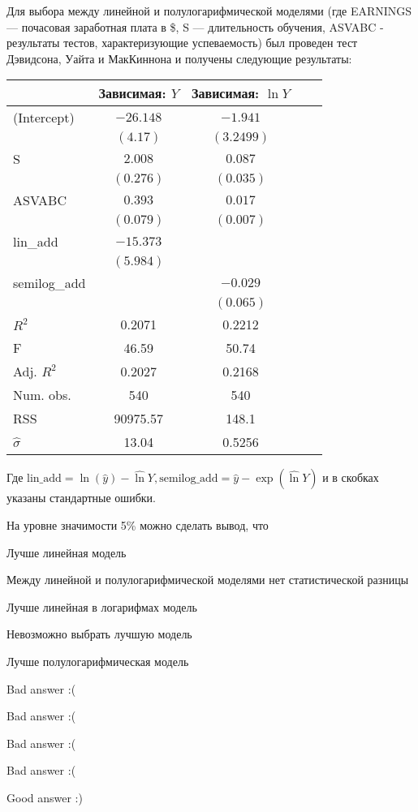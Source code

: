 
\begin{question}
Для выбора между линейной и полулогарифмической моделями (где EARNINGS --- почасовая заработная плата в \$, S --- длительность обучения, ASVABC - результаты тестов, характеризующие успеваемость) был проведен тест Дэвидсона, Уайта и МакКиннона и получены следующие результаты:

\begin{tabular}{l c c c c }
\toprule
& Зависимая: $Y$ & Зависимая: $\ln Y$  \\
\midrule
(Intercept) & $-26.148$     &  $-1.941$    \\
& $(4.17)$     &  $(3.2499)$   \\
S           &  $2.008$     &  $0.087$ \\
& $(0.276)$    &  $(0.035)$ \\
ASVABC      &  $0.393$    &   $0.017$ \\
& $(0.079)$   &   $(0.007)$ \\
lin\_add    &  $-15.373$   &     \\
&   $(5.984)$  &     \\

semilog\_add    &              & $-0.029$    \\
&              & $(0.065)$  \\
\midrule
$R^2$        & 0.2071         & 0.2212        \\
F            & 46.59          & 50.74          \\
Adj. $R^2$   & 0.2027         & 0.2168        \\
Num. obs.    & 540            & 540           \\
RSS          & 90975.57          & 148.1      \\
$\hat\sigma$ & 13.04        & 0.5256      \\
\bottomrule
\end{tabular}

Где \(\text{lin\_add} = \ln(\hat y) - \widehat{\ln} Y, \text{semilog\_add} = \hat y - \exp(\widehat{\ln} Y)\) и в скобках указаны стандартные ошибки.

На уровне значимости 5\% можно сделать вывод, что
\begin{answerlist}
  \item Лучше линейная модель
  \item Между линейной и полулогарифмической моделями нет статистической разницы
  \item Лучше линейная в логарифмах модель
  \item Невозможно выбрать лучшую модель
  \item Лучше полулогарифмическая модель
\end{answerlist}
\end{question}

\begin{solution}
\begin{answerlist}
  \item Bad answer :(
  \item Bad answer :(
  \item Bad answer :(
  \item Bad answer :(
  \item Good answer :)
\end{answerlist}
\end{solution}

